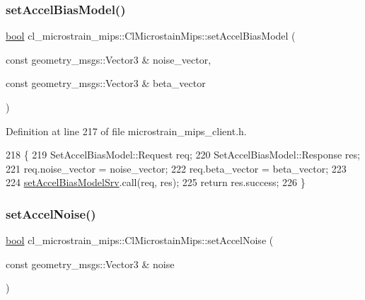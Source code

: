 \subsubsection{\texorpdfstring{set\+Accel\+Bias\+Model()}{setAccelBiasModel()}}
{\footnotesize\ttfamily \hyperlink{classbool}{bool} cl\+\_\+microstrain\+\_\+mips\+::\+Cl\+Microstain\+Mips\+::set\+Accel\+Bias\+Model (\begin{DoxyParamCaption}\item[{const geometry\+\_\+msgs\+::\+Vector3 \&}]{noise\+\_\+vector,  }\item[{const geometry\+\_\+msgs\+::\+Vector3 \&}]{beta\+\_\+vector }\end{DoxyParamCaption})\hspace{0.3cm}{\ttfamily [inline]}}



Definition at line 217 of file microstrain\+\_\+mips\+\_\+client.\+h.


\begin{DoxyCode}
218     \{
219         SetAccelBiasModel::Request req;
220         SetAccelBiasModel::Response res;
221         req.noise\_vector = noise\_vector;
222         req.beta\_vector = beta\_vector;
223 
224         \hyperlink{classcl__microstrain__mips_1_1ClMicrostainMips_a8d7c0f0a94dd6a25cac0130f8d9f55ff}{setAccelBiasModelSrv}.call(req, res);
225         \textcolor{keywordflow}{return} res.success;
226     \}
\end{DoxyCode}
\mbox{\label{classcl__microstrain__mips_1_1ClMicrostainMips_af003ab445879e23f969cca8e767a70f3}} 
\subsubsection{\texorpdfstring{set\+Accel\+Noise()}{setAccelNoise()}}
{\footnotesize\ttfamily \hyperlink{classbool}{bool} cl\+\_\+microstrain\+\_\+mips\+::\+Cl\+Microstain\+Mips\+::set\+Accel\+Noise (\begin{DoxyParamCaption}\item[{const geometry\+\_\+msgs\+::\+Vector3 \&}]{noise }\end{DoxyParamCaption})\hspace{0.3cm}{\ttfamily [inline]}}



